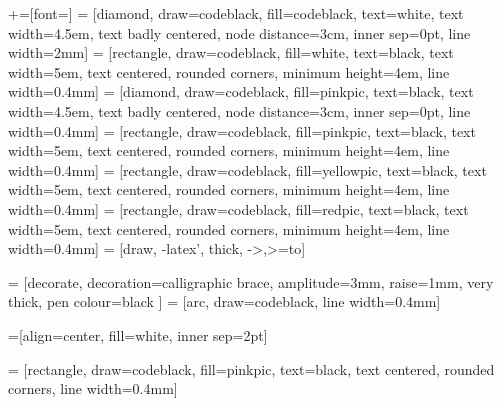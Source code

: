 +=[font=\footnotesize\sffamily]
\usetikzlibrary{calc, shapes, arrows, decorations.pathreplacing, calligraphy,
                positioning}
 = [diamond, draw=codeblack, fill=codeblack, text=white,
    text width=4.5em, text badly centered, node distance=3cm, inner sep=0pt,
    line width=2mm]
 = [rectangle, draw=codeblack, fill=white,  text=black,
    text width=5em, text centered, rounded corners, minimum height=4em,
    line width=0.4mm]
 = [diamond, draw=codeblack, fill=pinkpic, text=black,
    text width=4.5em, text badly centered, node distance=3cm, inner sep=0pt,
    line width=0.4mm]
 = [rectangle, draw=codeblack, fill=pinkpic,  text=black,
    text width=5em, text centered, rounded corners, minimum height=4em,
    line width=0.4mm]
 = [rectangle, draw=codeblack, fill=yellowpic,  text=black,
    text width=5em, text centered, rounded corners, minimum height=4em,
    line width=0.4mm]
 = [rectangle, draw=codeblack, fill=redpic,  text=black,
    text width=5em, text centered, rounded corners, minimum height=4em,
    line width=0.4mm]
 = [draw, -latex', thick, ->,>=to]

 =  [decorate,  %
                 decoration={calligraphic brace, amplitude=3mm, raise=1mm},
                 very thick, pen colour={black} ]
 = [arc, draw=codeblack, line width=0.4mm]

=[align=center, fill=white, inner sep=2pt]

 = [rectangle, draw=codeblack, fill=pinkpic,  text=black,
    text centered, rounded corners, line width=0.4mm]
